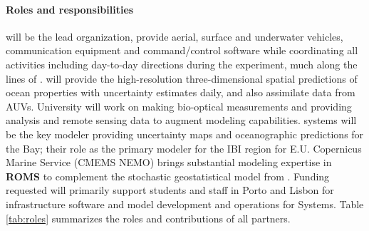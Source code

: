 \paragraph{Roles and responsibilities} \univ will be the lead
organization, provide aerial, surface and underwater vehicles,
communication equipment and command/control software while
coordinating all activities including day-to-day directions during the
experiment, much along the lines of \oldproje. \IST will provide the
high-resolution three-dimensional spatial predictions of ocean properties with
uncertainty estimates daily, and also assimilate data from AUVs. \colo
University will work on making bio-optical measurements and providing
analysis and remote sensing data to augment \IST modeling
capabilities. \now systems will be the key modeler providing
uncertainty maps and oceanographic predictions for the \set Bay; their
role as the primary modeler for the IBI region for E.U. Copernicus
Marine Service (CMEMS NEMO) \cite{CMEMS2017} brings substantial
modeling expertise in \textbf{ROMS} to complement the stochastic
geostatistical model from \ISTe.  Funding requested will primarily
support students and staff in Porto and Lisbon for infrastructure
software and model development and operations for \now Systems. Table
\ref{tab:roles} summarizes the roles and contributions of all
partners.

